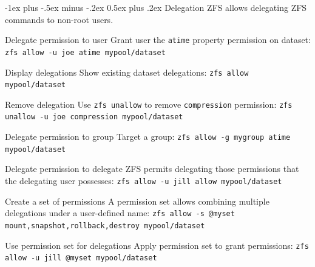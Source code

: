 \documentclass[10pt,landscape,letter]{article}
\makeatletter
\renewcommand{\section}{\@startsection{section}{1}{0mm}%
                                {-1ex plus -.5ex minus -.2ex}%
                                {0.5ex plus .2ex}%
                                {\normalfont\large\bfseries}}
\makeatother
\begin{document}
\begin{multicols}{3}
  \section{Delegation}
  ZFS allows delegating ZFS commands to non-root users.
	\begin{Description}
    \item[Delegate permission to user] Grant user the \texttt{atime} property
      permission on dataset: \texttt{zfs allow -u joe atime mypool/dataset}
    \item[Display delegations] Show existing dataset delegations: \texttt{zfs allow mypool/dataset}
    \item[Remove delegation] Use \texttt{zfs unallow} to remove \texttt{compression} permission:
      \texttt{zfs unallow -u joe compression mypool/dataset}
    \item[Delegate permission to group] Target a group:
      \texttt{zfs allow -g mygroup atime mypool/dataset}
    \item[Delegate permission to delegate] ZFS permits delegating those permissions that the delegating
      user possesses: \texttt{zfs allow -u jill allow
      mypool/dataset}
    \item[Create a set of permissions] A permission set allows combining multiple delegations under a user-defined name:
      \texttt{zfs allow -s @myset mount,snapshot,rollback,destroy mypool/dataset}
    \item[Use permission set for delegations] Apply permission set
      to grant permissions: \texttt{zfs allow -u jill @myset
      mypool/dataset}
	\end{Description}



\end{multicols}
\end{document}
